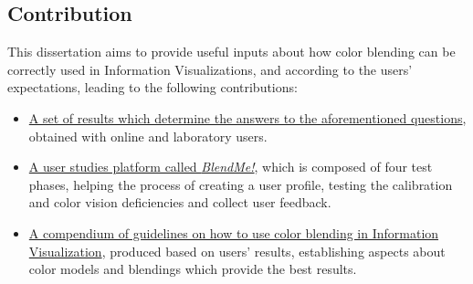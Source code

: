 \subsection{Contribution}
%
This dissertation aims to provide useful inputs about how color blending can be correctly used in Information Visualizations,
and according to the users' expectations, leading to the following contributions:
%
\begin{itemize}
  \item \ul{A set of results which determine the answers to the aforementioned questions}, obtained with online and laboratory
  users.
  \item \ul{A user studies platform called \emph{BlendMe!}}, which is composed of four test phases, helping the process of creating
  a user profile, testing the calibration and color vision deficiencies and collect user feedback.
  \item \ul{A compendium of guidelines on how to use color blending in Information Visualization}, produced based on users'
  results, establishing aspects about color models and blendings which provide the best results.
\end{itemize}
